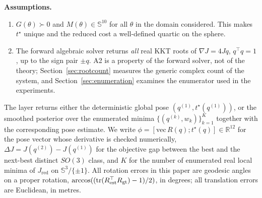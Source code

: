\textbf{Assumptions.}
\begin{enumerate}
\item[(A1)] $G(\theta)\succ0$ and $M(\theta)\in\mathbb{S}^{10}$ for all $\theta$ in the domain considered. This makes $t^\star$ unique and the reduced cost a well-defined quartic on the sphere.
\item[(A2)] The forward algebraic solver returns \emph{all} real KKT roots of $\nabla J=4Jq$, $q^\top q=1$, up to the sign pair $\pm q$. A2 is a property of the forward solver, not of the theory; Section~\ref{sec:rootcount} measures the generic complex count of the system, and Section~\ref{sec:enumeration} examines the enumerator used in the experiments.
\end{enumerate}

The layer returns either the deterministic global pose $(q^{(1)},t^\star(q^{(1)}))$, or the smoothed posterior over the enumerated minima $\{(q^{(k)},w_k)\}_{k=1}^{K}$ together with the corresponding pose estimate. We write $\phi=[\mathrm{vec}\,R(q);t^\star(q)]\in\mathbb{R}^{12}$ for the pose vector whose derivative is checked numerically, $\Delta J=J(q^{(2)})-J(q^{(1)})$ for the objective gap between the best and the next-best distinct $SO(3)$ class, and $K$ for the number of enumerated real local minima of $J_{\mathrm{red}}$ on $\mathbb{S}^3/\{\pm1\}$. All rotation errors in this paper are geodesic angles on a proper rotation, $\arccos((\operatorname{tr}(R_{\rm est}^\top R_{\rm gt})-1)/2)$, in degrees; all translation errors are Euclidean, in metres.
